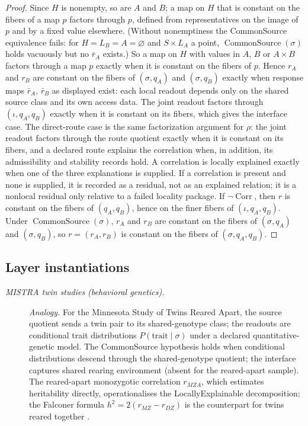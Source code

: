 \begin{proof}
Since \(H\) is nonempty, so are \(A\) and \(B\); a map on \(H\) that is constant on the fibers of a map \(p\) factors through \(p\), defined from representatives on the image of \(p\) and by a fixed value elsewhere. (Without nonemptiness the CommonSource equivalence fails: for \(H=L_B=A=\varnothing\) and \(S\times L_A\) a point, \(\operatorname{CommonSource}(\sigma)\) holds vacuously but no \(\bar r_A\) exists.) So a map on \(H\) with values in \(A\), \(B\) or \(A\times B\) factors through a map \(p\) exactly when it is constant on the fibers of \(p\). Hence \(r_A\) and \(r_B\) are constant on the
fibers of \((\sigma,q_A)\) and \((\sigma,q_B)\) exactly when response maps
\(\bar r_A\), \(\bar r_B\) as displayed exist: each local readout depends only
on the shared source class and its own access data. The
joint readout factors through \((\iota,q_A,q_B)\)
exactly when it is constant on its fibers, which gives the interface
case. The direct-route case is the same factorization argument for \(\rho\): the joint readout factors through the route
quotient exactly when it is constant on its fibers, and a declared route
explains the correlation when, in addition, its admissibility and
stability records hold. A correlation is
locally explained exactly when one of the three explanations is
supplied. If a correlation is present and none is supplied, it is
recorded as a residual, not as an explained relation; it is a nonlocal
residual only relative to a failed locality package.
If \(\neg\operatorname{Corr}\), then \(r\) is constant on the fibers of \((q_A,q_B)\), hence on the finer fibers of \((\iota,q_A,q_B)\). Under \(\operatorname{CommonSource}(\sigma)\), \(r_A\) and \(r_B\) are constant on the fibers of \((\sigma,q_A)\) and \((\sigma,q_B)\), so \(r=(r_A,r_B)\) is constant on the fibers of \((\sigma,q_A,q_B)\).
\end{proof}

\subsection*{Layer instantiations}\label{layer-inst:F49}

\begingroup\small
\begin{description}
\item[\emph{{MISTRA} twin studies (behavioral
genetics).}] \textit{Analogy.}
For the Minnesota Study of Twins Reared Apart, the
source quotient sends a twin pair to its
shared-genotype class; the readouts are conditional
trait
distributions
\(P(\mathrm{trait}\mid\sigma)\) under a declared
quantitative-genetic model.  The CommonSource
hypothesis holds when conditional distributions
descend through the shared-genotype quotient; the
interface captures shared rearing environment
(absent for the reared-apart sample).  The reared-apart monozygotic
correlation \(r_{MZA}\), which estimates heritability directly,
operationalises the  LocallyExplainable decomposition; the
Falconer formula \(h^2=2(r_{MZ}-r_{DZ})\) is the counterpart for
twins reared together
\citep{Bouchard1990Sources}.

\end{description}
\endgroup


